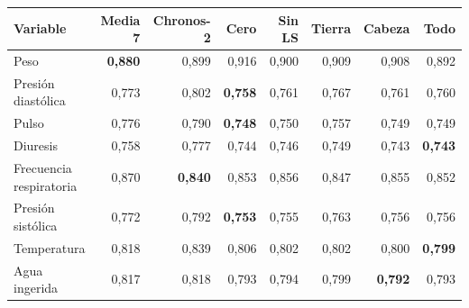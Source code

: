 \begin{tabular}{lrrrrrrr}\toprule
 Variable & Media 7 & Chronos-2 & Cero & Sin LS & Tierra & Cabeza & Todo \\
\midrule
Peso & \textbf{0,880} & 0,899 & 0,916 & 0,900 & 0,909 & 0,908 & 0,892 \\
Presión diastólica & 0,773 & 0,802 & \textbf{0,758} & 0,761 & 0,767 & 0,761 & 0,760 \\
Pulso & 0,776 & 0,790 & \textbf{0,748} & 0,750 & 0,757 & 0,749 & 0,749 \\
Diuresis & 0,758 & 0,777 & 0,744 & 0,746 & 0,749 & 0,743 & \textbf{0,743} \\
Frecuencia respiratoria & 0,870 & \textbf{0,840} & 0,853 & 0,856 & 0,847 & 0,855 & 0,852 \\
Presión sistólica & 0,772 & 0,792 & \textbf{0,753} & 0,755 & 0,763 & 0,756 & 0,756 \\
Temperatura & 0,818 & 0,839 & 0,806 & 0,802 & 0,802 & 0,800 & \textbf{0,799} \\
Agua ingerida & 0,817 & 0,818 & 0,793 & 0,794 & 0,799 & \textbf{0,792} & 0,793 \\
\bottomrule\end{tabular}
